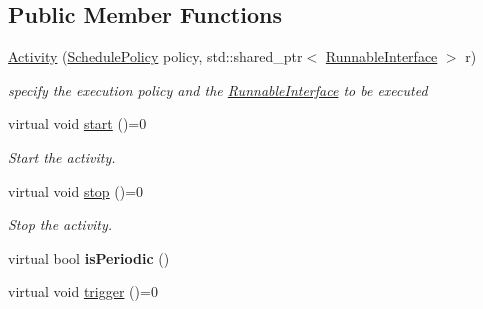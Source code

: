 \subsection*{Public Member Functions}
\begin{DoxyCompactItemize}
\item 
\hypertarget{classcoco_1_1_activity_af87c30a3b206f7f77c832f4e1e2c1d81}{\hyperlink{classcoco_1_1_activity_af87c30a3b206f7f77c832f4e1e2c1d81}{Activity} (\hyperlink{structcoco_1_1_schedule_policy}{Schedule\-Policy} policy, std\-::shared\-\_\-ptr$<$ \hyperlink{classcoco_1_1_runnable_interface}{Runnable\-Interface} $>$ r)}\label{classcoco_1_1_activity_af87c30a3b206f7f77c832f4e1e2c1d81}

\begin{DoxyCompactList}\small\item\em specify the execution policy and the \hyperlink{classcoco_1_1_runnable_interface}{Runnable\-Interface} to be executed \end{DoxyCompactList}\item 
\hypertarget{classcoco_1_1_activity_a542dbe1300aa4f03b165dbe4edeb96dd}{virtual void \hyperlink{classcoco_1_1_activity_a542dbe1300aa4f03b165dbe4edeb96dd}{start} ()=0}\label{classcoco_1_1_activity_a542dbe1300aa4f03b165dbe4edeb96dd}

\begin{DoxyCompactList}\small\item\em Start the activity. \end{DoxyCompactList}\item 
\hypertarget{classcoco_1_1_activity_a5c81aa82b5987e3ef5c56affdaefbbaf}{virtual void \hyperlink{classcoco_1_1_activity_a5c81aa82b5987e3ef5c56affdaefbbaf}{stop} ()=0}\label{classcoco_1_1_activity_a5c81aa82b5987e3ef5c56affdaefbbaf}

\begin{DoxyCompactList}\small\item\em Stop the activity. \end{DoxyCompactList}\item 
\hypertarget{classcoco_1_1_activity_a4359a691fe84c7334a6e956cd56b7752}{virtual bool {\bfseries is\-Periodic} ()}\label{classcoco_1_1_activity_a4359a691fe84c7334a6e956cd56b7752}

\item 
\hypertarget{classcoco_1_1_activity_ad270583e0ec466f87df956bd7673f554}{virtual void \hyperlink{classcoco_1_1_activity_ad270583e0ec466f87df956bd7673f554}{trigger} ()=0}\label{classcoco_1_1_activity_ad270583e0ec466f87df956bd7673f554}


\end{DoxyCompactItemize}
